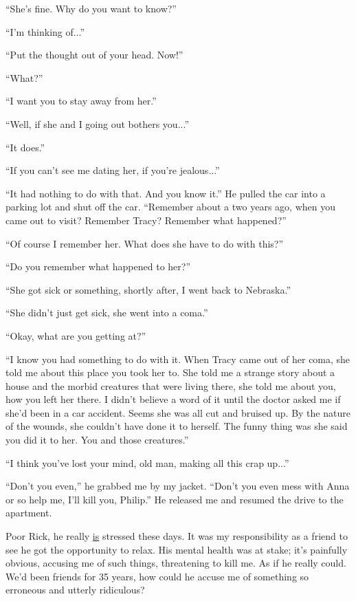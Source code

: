``She's fine. Why do you want to know?''

``I'm thinking of...''

``Put the thought out of your head. Now!''

``What?''

``I want you to stay away from her.''

``Well, if she and I going out bothers you...''

``It does.''

``If you can't see me dating her, if you're jealous...''

``It had nothing to do with that. And you know it.'' He pulled the car
into a parking lot and shut off the car. ``Remember about a two years
ago, when you came out to visit? Remember Tracy? Remember what
happened?''

``Of course I remember her. What does she have to do with this?''

``Do you remember what happened to her?''

``She got sick or something, shortly after, I went back to Nebraska.''

``She didn't just get sick, she went into a coma.''

``Okay, what are you getting at?''

``I know you had something to do with it. When Tracy came out of her
coma, she told me about this place you took her to. She told me a
strange story about a house and the morbid creatures that were living
there, she told me about you, how you left her there. I didn't believe a
word of it until the doctor asked me if she'd been in a car accident.
Seems she was all cut and bruised up. By the nature of the wounds, she
couldn't have done it to herself. The funny thing was she said you did
it to her. You and those creatures.''

``I think you've lost your mind, old man, making all this crap up...''

``Don't you even,'' he grabbed me by my jacket. ``Don't you even mess
with Anna or so help me, I'll kill you, Philip.'' He released me and
resumed the drive to the apartment.

Poor Rick, he really \ul{is} stressed these days. It was my
responsibility as a friend to see he got the opportunity to relax. His
mental health was at stake; it's painfully obvious, accusing me of such
things, threatening to kill me. As if he really could. We'd been friends
for 35 years, how could he accuse me of something so erroneous and
utterly ridiculous?

